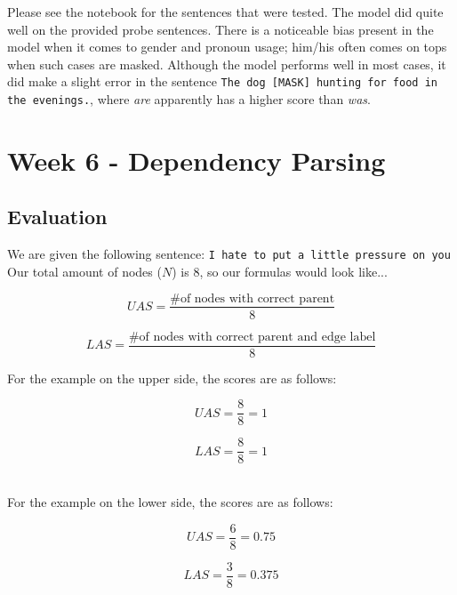 \documentclass[a4paper, 11pt]{article}
\begin{document}
Please see the notebook for the sentences that were tested. The model did quite well on the provided probe sentences. There is a noticeable bias present in the model when it comes to gender and pronoun usage; him/his often comes on tops when such cases are masked. Although the model performs well in most cases, it did make a slight error in the sentence \texttt{The dog [MASK] hunting for food in the evenings.}, where \textit{are} apparently has a higher score than \textit{was}. 

\section{Week 6 - Dependency Parsing}

\subsection{Evaluation}

We are given the following sentence: \texttt{I hate to put a little pressure on you}\\

Our total amount of nodes ($N$) is 8, so our formulas would look like...

	\begin{equation}
		UAS = \frac{\text{\# of nodes with correct parent}}{8}
	\end{equation}

	\begin{equation}
		LAS = \frac{\text{\# of nodes with correct parent and edge label}}{8}
	\end{equation}

For the example on the upper side, the scores are as follows:

\noindent\begin{minipage}{.5\linewidth}
	\begin{equation}
		UAS = \frac{8}{8} = 1
	\end{equation}
\end{minipage}%
\begin{minipage}{.5\linewidth}
	\begin{equation}
		LAS = \frac{8}{8} = 1
	\end{equation}
\end{minipage}\\

For the example on the lower side, the scores are as follows:

\noindent\begin{minipage}{.5\linewidth}
	\begin{equation}
		UAS = \frac{6}{8} = 0.75
	\end{equation}
\end{minipage}%
\begin{minipage}{.5\linewidth}
	\begin{equation}
		LAS = \frac{3}{8} = 0.375
	\end{equation}
\end{minipage}
\end{document}

